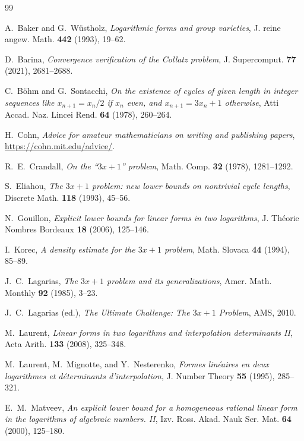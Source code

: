 \documentclass[11pt, a4paper]{amsart}
\theoremstyle{plain}
\theoremstyle{definition}
\theoremstyle{remark}
\begin{document}
\begin{thebibliography}{99}

A.~Baker and G.~W\"ustholz,
\emph{Logarithmic forms and group varieties},
J. reine angew. Math. \textbf{442} (1993), 19--62.

D.~Barina,
\emph{Convergence verification of the Collatz problem},
J. Supercomput. \textbf{77} (2021), 2681--2688.

C.~B\"ohm and G.~Sontacchi,
\emph{On the existence of cycles of given length in integer
sequences like $x_{n+1} = x_n/2$ if $x_n$ even, and
$x_{n+1} = 3x_n + 1$ otherwise},
Atti Accad. Naz. Lincei Rend. \textbf{64} (1978), 260--264.

H.~Cohn,
\emph{Advice for amateur mathematicians on writing and
publishing papers},
\url{https://cohn.mit.edu/advice/}.

R.~E.~Crandall,
\emph{On the ``$3x + 1$'' problem},
Math. Comp. \textbf{32} (1978), 1281--1292.

S.~Eliahou,
\emph{The $3x + 1$ problem: new lower bounds on nontrivial
cycle lengths},
Discrete Math. \textbf{118} (1993), 45--56.

N.~Gouillon,
\emph{Explicit lower bounds for linear forms in two logarithms},
J. Th\'eorie Nombres Bordeaux \textbf{18} (2006), 125--146.

I.~Korec,
\emph{A density estimate for the $3x + 1$ problem},
Math. Slovaca \textbf{44} (1994), 85--89.

J.~C.~Lagarias,
\emph{The $3x + 1$ problem and its generalizations},
Amer. Math. Monthly \textbf{92} (1985), 3--23.

J.~C.~Lagarias (ed.),
\emph{The Ultimate Challenge: The $3x + 1$ Problem},
AMS, 2010.

M.~Laurent,
\emph{Linear forms in two logarithms and interpolation
determinants II},
Acta Arith. \textbf{133} (2008), 325--348.

M.~Laurent, M.~Mignotte, and Y.~Nesterenko,
\emph{Formes lin\'eaires en deux logarithmes et d\'eterminants
d'interpolation},
J. Number Theory \textbf{55} (1995), 285--321.

E.~M.~Matveev,
\emph{An explicit lower bound for a homogeneous rational
linear form in the logarithms of algebraic numbers. II},
Izv. Ross. Akad. Nauk Ser. Mat. \textbf{64} (2000), 125--180.


\end{thebibliography}
\end{document}
